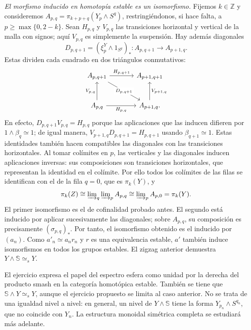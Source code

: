 \begin{sol}
\emph{El morfismo inducido en homotopía estable es un isomorfismo.} Fijemos $k\in\mathbb Z$ y consideremos $A_{p,q}=\pi_{k+p+q}(Y_p\wedge S^q)$, restringiéndonos, si hace falta, a $p\ge\max\{0,2-k\}$. Sean $H_{p,q}$ y $V_{p,q}$ las transiciones horizontal y vertical de la malla con signos; aquí $V_{p,q}$ es simplemente la suspensión. Hay además diagonales
\[
D_{p,q+1}=(\xi_p^Y\wedge1_{S^q})_*\colon
A_{p,q+1}\longrightarrow A_{p+1,q}.
\]
Estas dividen cada cuadrado en dos triángulos conmutativos:
\[
\begin{tikzcd}[column sep=large,row sep=large]
A_{p,q+1} \arrow[r,"H_{p,q+1}"] \arrow[dr,"D_{p,q+1}" description]
& A_{p+1,q+1}\\
A_{p,q} \arrow[u,"V_{p,q}"] \arrow[r,"H_{p,q}"']
& A_{p+1,q} \arrow[u,"V_{p+1,q}"'].
\end{tikzcd}
\]
En efecto, $D_{p,q+1}V_{p,q}=H_{p,q}$ porque las aplicaciones que las inducen difieren por $1\wedge\beta_q\simeq1$; de igual manera, $V_{p+1,q}D_{p,q+1}=H_{p,q+1}$ usando $\beta_{q+1}\simeq1$. Estas identidades también hacen compatibles las diagonales con las transiciones horizontales. Al tomar colímites en $p$, las verticales y las diagonales inducen aplicaciones inversas: sus composiciones son transiciones horizontales, que representan la identidad en el colímite. Por ello todos los colímites de las filas se identifican con el de la fila $q=0$, que es $\pi_k(Y)$, y
\[
\pi_k(Z)\cong\varinjlim\nolimits_{q}\varinjlim\nolimits_{p}A_{p,q}
\cong\varinjlim\nolimits_{p}A_{p,0}=\pi_k(Y).
\]
El primer isomorfismo es el de cofinalidad probado antes. El segundo está inducido por aplicar sucesivamente las diagonales; sobre $A_{p,q}$, su composición es precisamente $(\sigma_{p,q})_*$. Por tanto, el isomorfismo obtenido es el inducido por $(a_n)$. Como $a'_n\simeq a_n r_n$ y $r$ es una equivalencia estable, $a'$ también induce isomorfismos en todos los grupos estables. El zigzag anterior demuestra $Y\wedge\mathbb S\simeq_sY$.
\end{sol}

El ejercicio expresa el papel del espectro esfera como unidad por la derecha del producto smash en la categoría homotópica estable. También se tiene que $\mathbb S\wedge Y\simeq_sY$, aunque el ejercicio propuesto se limita al caso anterior. No se trata de una igualdad nivel a nivel: en general, un nivel de $Y\wedge\mathbb S$ tiene la forma $Y_{p_n}\wedge S^{q_n}$, que no coincide con $Y_n$. La estructura monoidal simétrica completa se estudiará más adelante.

